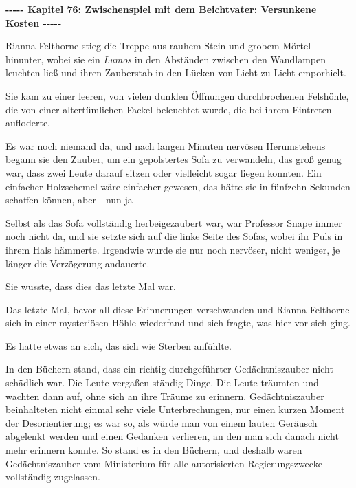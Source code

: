 

\hypertarget{zwischenspiel-mit-dem-beichtvater-versunkene-kosten}{%

\textbf{-\/-\/-\/-\/- Kapitel 76: Zwischenspiel mit dem Beichtvater: Versunkene Kosten -\/-\/-\/-\/-}

Rianna Felthorne stieg die Treppe aus rauhem Stein und grobem Mörtel hinunter, wobei sie ein \emph{Lumos} in den Abständen zwischen den Wandlampen leuchten ließ und ihren Zauberstab in den Lücken von Licht zu Licht emporhielt.

Sie kam zu einer leeren, von vielen dunklen Öffnungen durchbrochenen Felshöhle, die von einer altertümlichen Fackel beleuchtet wurde, die bei ihrem Eintreten aufloderte.

Es war noch niemand da, und nach langen Minuten nervösen Herumstehens begann sie den Zauber, um ein gepolstertes Sofa zu verwandeln, das groß genug war, dass zwei Leute darauf sitzen oder vielleicht sogar liegen konnten. Ein einfacher Holzschemel wäre einfacher gewesen, das hätte sie in fünfzehn Sekunden schaffen können, aber - nun ja -

Selbst als das Sofa vollständig herbeigezaubert war, war Professor Snape immer noch nicht da, und sie setzte sich auf die linke Seite des Sofas, wobei ihr Puls in ihrem Hals hämmerte. Irgendwie wurde sie nur noch nervöser, nicht weniger, je länger die Verzögerung andauerte.

Sie wusste, dass dies das letzte Mal war.

Das letzte Mal, bevor all diese Erinnerungen verschwanden und Rianna Felthorne sich in einer mysteriösen Höhle wiederfand und sich fragte, was hier vor sich ging.

Es hatte etwas an sich, das sich wie Sterben anfühlte.

In den Büchern stand, dass ein richtig durchgeführter Gedächtniszauber nicht schädlich war. Die Leute vergaßen ständig Dinge. Die Leute träumten und wachten dann auf, ohne sich an ihre Träume zu erinnern. Gedächtniszauber beinhalteten nicht einmal sehr viele Unterbrechungen, nur einen kurzen Moment der Desorientierung; es war so, als würde man von einem lauten Geräusch abgelenkt werden und einen Gedanken verlieren, an den man sich danach nicht mehr erinnern konnte. So stand es in den Büchern, und deshalb waren Gedächtniszauber vom Ministerium für alle autorisierten Regierungszwecke vollständig zugelassen.

}
